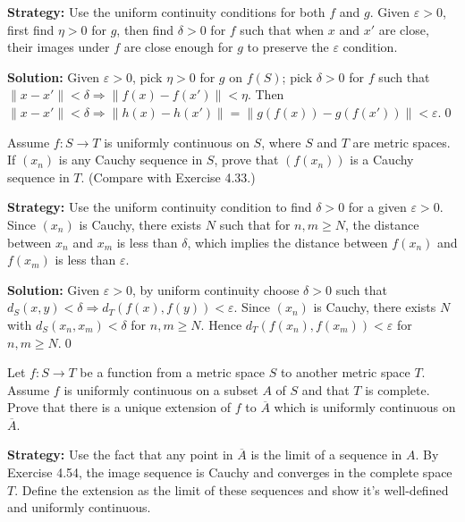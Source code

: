 \noindent\textbf{Strategy:} Use the uniform continuity conditions for both $f$ and $g$. Given $\varepsilon > 0$, first find $\eta > 0$ for $g$, then find $\delta > 0$ for $f$ such that when $x$ and $x'$ are close, their images under $f$ are close enough for $g$ to preserve the $\varepsilon$ condition.

\bigskip\noindent\textbf{Solution:}
Given $\varepsilon>0$, pick $\eta>0$ for $g$ on $f(S)$; pick $\delta>0$ for $f$ such that $\|x-x'\|<\delta\Rightarrow \|f(x)-f(x')\|<\eta$. Then $\|x-x'\|<\delta\Rightarrow \|h(x)-h(x')\|=\|g(f(x))-g(f(x'))\|<\varepsilon$.\qed



\begin{problembox}
Assume $f : S \to T$ is uniformly continuous on $S$, where $S$ and $T$ are metric spaces. If $(x_n)$ is any Cauchy sequence in $S$, prove that $(f(x_n))$ is a Cauchy sequence in $T$. (Compare with Exercise 4.33.)
\end{problembox}

\noindent\textbf{Strategy:} Use the uniform continuity condition to find $\delta > 0$ for a given $\varepsilon > 0$. Since $(x_n)$ is Cauchy, there exists $N$ such that for $n, m \geq N$, the distance between $x_n$ and $x_m$ is less than $\delta$, which implies the distance between $f(x_n)$ and $f(x_m)$ is less than $\varepsilon$.

\bigskip\noindent\textbf{Solution:}
Given $\varepsilon>0$, by uniform continuity choose $\delta>0$ such that $d_S(x,y)<\delta\Rightarrow d_T(f(x),f(y))<\varepsilon$. Since $(x_n)$ is Cauchy, there exists $N$ with $d_S(x_n,x_m)<\delta$ for $n,m\ge N$. Hence $d_T(f(x_n),f(x_m))<\varepsilon$ for $n,m\ge N$.\qed



\begin{problembox}
Let $f : S \to T$ be a function from a metric space $S$ to another metric space $T$. Assume $f$ is uniformly continuous on a subset $A$ of $S$ and that $T$ is complete. Prove that there is a unique extension of $f$ to $\overline{A}$ which is uniformly continuous on $\overline{A}$.
\end{problembox}

\noindent\textbf{Strategy:} Use the fact that any point in $\overline{A}$ is the limit of a sequence in $A$. By Exercise 4.54, the image sequence is Cauchy and converges in the complete space $T$. Define the extension as the limit of these sequences and show it's well-defined and uniformly continuous.


